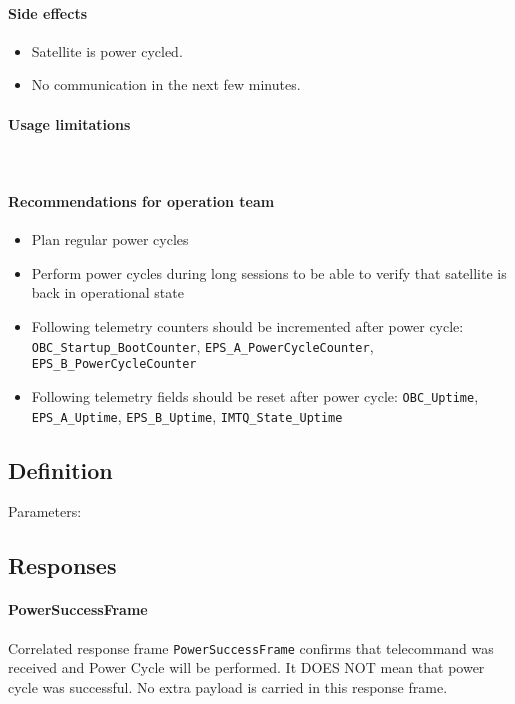 \paragraph{Side effects}
\begin{itemize}
	\item Satellite is power cycled. 
	\item No communication in the next few minutes.
\end{itemize}

\paragraph{Usage limitations}\mbox{}\\ 
\None

\paragraph{Recommendations for operation team}
\begin{itemize}
	\item Plan regular power cycles
	\item Perform power cycles during long sessions to be able to verify that satellite is back in operational state
	\item Following telemetry counters should be incremented after power cycle: \texttt{OBC_Startup_BootCounter}, \texttt{EPS_A_PowerCycleCounter}, \texttt{EPS_B_PowerCycleCounter}
	\item Following telemetry fields should be reset after power cycle: \texttt{OBC_Uptime}, \texttt{EPS_A_Uptime}, \texttt{EPS_B_Uptime}, \texttt{IMTQ_State_Uptime}
\end{itemize}


\subsection{Definition}

Parameters: 

\begin{tcarglist}
\end{tcarglist}


\subsection{Responses}

\paragraph{PowerSuccessFrame}
Correlated response frame \texttt{PowerSuccessFrame} confirms that telecommand was received and Power Cycle will be performed. It DOES NOT mean that power cycle was successful. No extra payload is carried in this response frame.

